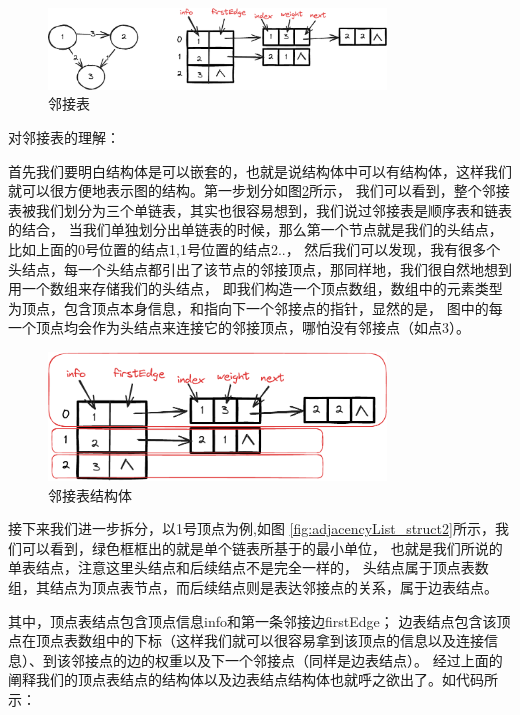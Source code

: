 \documentclass[lang=cn,newtx,10pt,scheme=chinese]{../elegantbook}
\begin{document}
\begin{figure}[h!]
  \centering
  \includegraphics[width=0.8\textwidth]{./figure/pdf/cropped/adjacencyList.pdf}
  \caption{邻接表}
  \label{fig:adjacencyList}
\end{figure}

对邻接表的理解：

首先我们要明白结构体是可以嵌套的，也就是说结构体中可以有结构体，这样我们就可以很方便地表示图的结构。第一步划分如图\ref{fig:adjacencyList_struct}所示，
我们可以看到，整个邻接表被我们划分为三个单链表，其实也很容易想到，我们说过邻接表是顺序表和链表的结合，
当我们单独划分出单链表的时候，那么第一个节点就是我们的头结点，比如上面的0号位置的结点1,1号位置的结点2..，
然后我们可以发现，我有很多个头结点，每一个头结点都引出了该节点的邻接顶点，那同样地，我们很自然地想到用一个数组来存储我们的头结点，
即我们构造一个顶点数组，数组中的元素类型为顶点，包含顶点本身信息，和指向下一个邻接点的指针，显然的是，
图中的每一个顶点均会作为头结点来连接它的邻接顶点，哪怕没有邻接点（如点3）。

\begin{figure}[h!]
  \centering
  \includegraphics[width=0.8\textwidth]{./figure/pdf/cropped/adjacencyList_struct.pdf}
  \caption{邻接表结构体}
  \label{fig:adjacencyList_struct}
\end{figure}

接下来我们进一步拆分，以1号顶点为例,如图 \ref{fig:adjacencyList_struct2}所示，我们可以看到，绿色框框出的就是单个链表所基于的最小单位，
也就是我们所说的单表结点，注意这里头结点和后续结点不是完全一样的，
头结点属于顶点表数组，其结点为顶点表节点，而后续结点则是表达邻接点的关系，属于边表结点。

其中，顶点表结点包含顶点信息info和第一条邻接边firstEdge；
边表结点包含该顶点在顶点表数组中的下标（这样我们就可以很容易拿到该顶点的信息以及连接信息）、到该邻接点的边的权重以及下一个邻接点（同样是边表结点）。
经过上面的阐释我们的顶点表结点的结构体以及边表结点结构体也就呼之欲出了。如代码所示：
\end{document}
